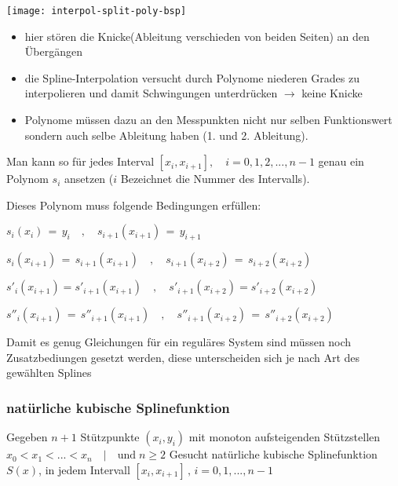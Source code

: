 \texttt{[image: interpol-split-poly-bsp]}

\begin{itemize}
    \item hier stören die Knicke(Ableitung verschieden von beiden Seiten) an 
        den Übergängen
    \item die Spline-Interpolation versucht durch Polynome niederen Grades zu 
        interpolieren und damit Schwingungen unterdrücken $\rightarrow$ keine Knicke
    \item Polynome müssen dazu an den Messpunkten nicht nur selben Funktionswert
        sondern auch selbe Ableitung haben (1. und 2. Ableitung).
\end{itemize}

Man kann so für jedes Interval $[x_i, x_{i+1}], \quad i = 0,1,2,...,n-1$ genau 
ein Polynom $s_i$ ansetzen ($i$ Bezeichnet die Nummer des Intervalls).

Dieses Polynom muss folgende Bedingungen erfüllen:
{\large
\begin{description}[itemsep=1mm]
    \item[Interpolation] $s_i(x_i) \, = \, y_i \quad,
        \quad s_{i+1}(x_{i+1}) \, = \, y_{i+1}$
    \item[stetiger Übergang] $s_i(x_{i+1}) \, = \, s_{i+1}(x_{i+1}) \quad,
        \quad s_{i+1}(x_{i+2}) \, = \, s_{i+2}(x_{i+2})$
    \item[keine Knicke] $s'_i(x_{i+1}) = s'_{i+1}(x_{i+1}) \quad,
        \quad s'_{i+1}(x_{i+2}) = s'_{i+2}(x_{i+2})$
    \item[gleiche Krümmung] $s''_i(x_{i+1}) \, = \, s''_{i+1}(x_{i+1}) \quad,
        \quad s''_{i+1}(x_{i+2}) \, = \, s''_{i+2}(x_{i+2})$
    \item[Zusatzbedingungen] Damit es genug Gleichungen für ein reguläres System
        sind müssen noch Zusatzbediungen gesetzt werden, diese unterscheiden sich
        je nach Art des gewählten Splines
\end{description}
}

\subsubsection{natürliche kubische Splinefunktion}
Gegeben $n+1$ Stützpunkte $(x_i, y_i)$ mit monoton aufsteigenden
Stützstellen $x_0 < x_1 < ... < x_n \quad | \quad \mathrm{und}\; n \ge 2$
Gesucht natürliche kubische Splinefunktion $S(x)$, in jedem Intervall $[x_i, x_{i+1}]\, ,\,i=0,1,...,n-1$




